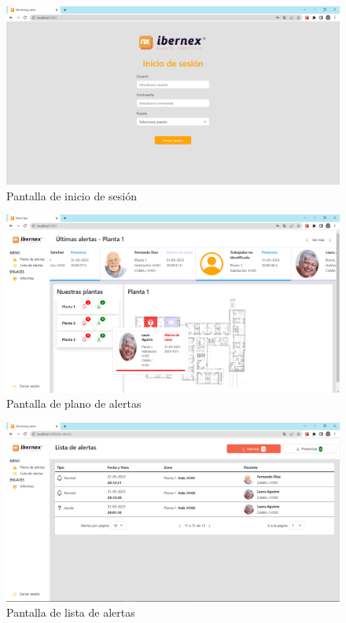 \begin{landscape}
\begin{figure}[!ht]
	\centering
	\includegraphics[width=25cm]{Imagenes/login.PNG}
	\caption{Pantalla de inicio de sesión}
	\label{fig:login}
\end{figure}

\begin{figure}[!ht]
	\centering
	\includegraphics[width=25cm]{Imagenes/map-alarmas-estados.PNG}
	\caption{Pantalla de plano de alertas}
	\label{fig:map}
\end{figure}

\begin{figure}[!ht]
	\centering
	\includegraphics[width=25cm]{Imagenes/list-pag2.PNG}
	\caption{Pantalla de lista de alertas}
	\label{fig:list}
\end{figure}
\end{landscape}



